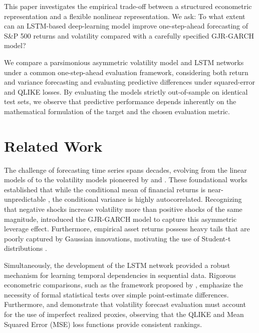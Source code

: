 \documentclass[11pt,a4paper]{article}
\begin{document}
This paper investigates the empirical trade-off between a structured econometric representation and a flexible nonlinear representation. We ask: To what extent can an LSTM-based deep-learning model improve one-step-ahead forecasting of S\&P 500 returns and volatility compared with a carefully specified GJR-GARCH model?

We compare a parsimonious asymmetric volatility model and LSTM networks under a common one-step-ahead evaluation framework, considering both return and variance forecasting and evaluating predictive differences under squared-error and QLIKE losses. By evaluating the models strictly out-of-sample on identical test sets, we observe that predictive performance depends inherently on the mathematical formulation of the target and the chosen evaluation metric. 

\section{Related Work}
The challenge of forecasting time series spans decades, evolving from the linear models of \cite{box1970time} to the volatility models pioneered by \cite{engle1982autoregressive} and \cite{bollerslev1986generalized}. These foundational works established that while the conditional mean of financial returns is near-unpredictable \cite{fama1965behavior}, the conditional variance is highly autocorrelated. Recognizing that negative shocks increase volatility more than positive shocks of the same magnitude, \cite{glosten1993relation} introduced the GJR-GARCH model to capture this asymmetric leverage effect. Furthermore, empirical asset returns possess heavy tails that are poorly captured by Gaussian innovations, motivating the use of Student-t distributions \cite{cont2001empirical}.

Simultaneously, the development of the LSTM network \cite{hochreiter1997long} provided a robust mechanism for learning temporal dependencies in sequential data. Rigorous econometric comparisons, such as the framework proposed by \cite{diebold1995comparing}, emphasize the necessity of formal statistical tests over simple point-estimate differences. Furthermore, \cite{patton2011volatility} and \cite{hansen2005forecast} demonstrate that volatility forecast evaluation must account for the use of imperfect realized proxies, observing that the QLIKE and Mean Squared Error (MSE) loss functions provide consistent rankings.
\end{document}
